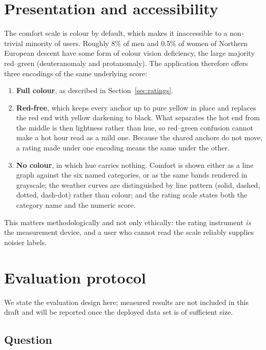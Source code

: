\documentclass[11pt]{article}
\begin{document}
\section{Presentation and accessibility}
\label{sec:presentation}

The comfort scale is colour by default, which makes it inaccessible to a
non-trivial minority of users. Roughly 8\% of men and 0.5\% of women of
Northern European descent have some form of colour vision deficiency, the
large majority red--green (deuteranomaly and protanomaly). The application
therefore offers three encodings of the same underlying score:

\begin{enumerate}
\item \textbf{Full colour}, as described in Section~\ref{sec:ratings}.
\item \textbf{Red-free}, which keeps every anchor up to pure yellow in place
      and replaces the red end with yellow darkening to black. What separates
      the hot end from the middle is then lightness rather than hue, so
      red--green confusion cannot make a hot hour read as a mild one. Because
      the shared anchors do not move, a rating made under one encoding means
      the same under the other.
\item \textbf{No colour}, in which hue carries nothing. Comfort is shown either
      as a line graph against the six named categories, or as the same bands
      rendered in grayscale; the weather curves are distinguished by line
      pattern (solid, dashed, dotted, dash-dot) rather than colour; and the
      rating scale states both the category name and the numeric score.
\end{enumerate}

This matters methodologically and not only ethically: the rating instrument
\emph{is} the measurement device, and a user who cannot read the scale
reliably supplies noisier labels.

\section{Evaluation protocol}
\label{sec:evaluation}

We state the evaluation design here; measured results are not included in this
draft and will be reported once the deployed data set is of sufficient size.

\subsection{Question}
\end{document}
